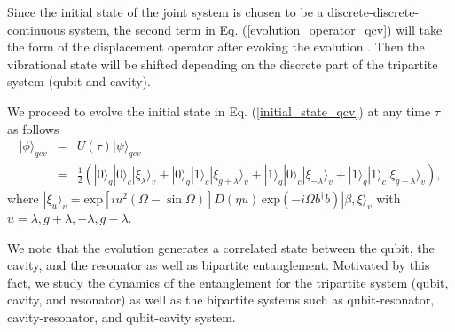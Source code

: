 Since the initial state of the joint system is chosen to be a discrete-discrete-continuous system, the second term in Eq. (\ref{evolution_operator_qcv}) will take the form of the displacement operator after evoking the evolution \cite{glauber1963coherent}. Then the vibrational state will be shifted depending on the discrete part of the tripartite system (qubit and cavity).

We proceed to evolve the initial state in Eq. (\ref{initial_state_qcv}) at any time $\tau$ as follows
\begin{eqnarray}\label{evolved_state_qcv}
|\phi\rangle_{qcv}&=&U(\tau)|\psi\rangle_{qcv}\nonumber\\
                  &=&\frac{1}{2}\left(|0\rangle_{q}|0\rangle_{c}|\xi_{\lambda}\rangle_{v}+|0\rangle_{q}|1\rangle_{c}|\xi_{g+\lambda}\rangle_{v}+|1\rangle_{q}|0\rangle_{c}|\xi_{-\lambda}\rangle_{v}+|1\rangle_{q}|1\rangle_{c}|\xi_{g-\lambda}\rangle_{v}\right),
\end{eqnarray}
where $|\xi_{u}\rangle_{v}=\textrm{exp}\left[i u^{2}\left(\Omega-\sin\Omega\right)\right]D(\eta u)\,\textrm{exp}\left(-i\Omega b^{\dagger}b\right)|\beta,\xi\rangle_{v}$ with $u=\lambda, g+\lambda,-\lambda, g-\lambda$.

We note that the evolution generates a correlated state between the qubit, the cavity, and the resonator as well as bipartite entanglement. Motivated by this fact, we study the dynamics of the entanglement for the tripartite system (qubit, cavity, and resonator) as well as the bipartite systems such as qubit-resonator, cavity-resonator, and qubit-cavity system.

